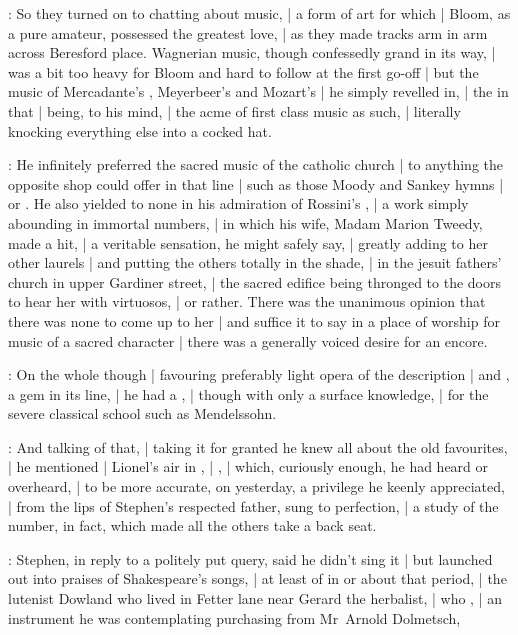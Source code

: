:
So they turned on to chatting about music, |
a form of art for which |
Bloom, as a pure amateur, possessed the greatest love, |
as they made tracks arm in arm across Beresford place.
Wagnerian music, though confessedly grand in its way, |
was a bit too heavy for Bloom and hard to follow at the first go-off |
but the music of Mercadante's ,
Meyerbeer's 
and Mozart's  |
he simply revelled in, |
the  in that |
being, to his mind, |
the acme of first class music as such, |
literally knocking everything else into a cocked hat.

:
He infinitely preferred the sacred music of the catholic church |
to anything the opposite shop could offer in that line |
such as those Moody and Sankey hymns |
or .
He also yielded to none in his admiration of Rossini's , |
a work simply abounding in immortal numbers, |
in which his wife, Madam Marion Tweedy, made a hit, |
a veritable sensation, he might safely say, |
greatly adding to her other laurels |
and putting the others totally in the shade, |
in the jesuit fathers' church in upper Gardiner street, |
the sacred edifice being thronged to the doors to hear her with virtuosos, |
or  rather.
There was the unanimous opinion that there was none to come up to her |
and suffice it to say in a place of worship for music of a sacred character |
there was a generally voiced desire for an encore.

:
On the whole though |
favouring preferably light opera of the  description |
and , a gem in its line, |
he had a , |
though with only a surface knowledge, |
for the severe classical school such as Mendelssohn.

:
And talking of that, |
taking it for granted he knew all about the old favourites, |
he mentioned  |
Lionel's air in , |
, |
which, curiously enough, he had heard or overheard, |
to be more accurate, on yesterday, a privilege he keenly appreciated, |
from the lips of Stephen's respected father, sung to perfection, |
a study of the number, in fact, which made all the others take a back seat.

:
Stephen, in reply to a politely put query, said he didn't sing it |
but launched out into praises of Shakespeare's songs, |
at least of in or about that period, |
the lutenist Dowland who lived in Fetter lane near Gerard the herbalist, |
who , |
an instrument he was contemplating purchasing from Mr~Arnold Dolmetsch,

